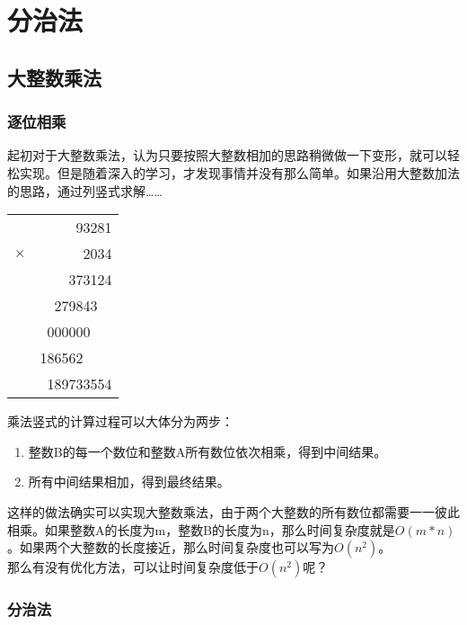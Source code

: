 \chapter{分治法}

\section{大整数乘法}

\subsection{逐位相乘}

起初对于大整数乘法，认为只要按照大整数相加的思路稍微做一下变形，就可以轻松实现。但是随着深入的学习，才发现事情并没有那么简单。如果沿用大整数加法的思路，通过列竖式求解……

\begin{table}[H]
	\centering
	\begin{tabular}{cD{.}{.}{3}}
		           & 93281         \\
		$ \times $ & 2034          \\
		\hline
		           & 373124        \\
		           & 279843\ \     \\
		           & 000000\ \ \   \\
		           & 186562\ \ \ \ \\
		\hline
		           & 189733554
	\end{tabular}
\end{table}

乘法竖式的计算过程可以大体分为两步：

\begin{enumerate}
	\item 整数B的每一个数位和整数A所有数位依次相乘，得到中间结果。
	\item 所有中间结果相加，得到最终结果。
\end{enumerate}

这样的做法确实可以实现大整数乘法，由于两个大整数的所有数位都需要一一彼此相乘。如果整数A的长度为m，整数B的长度为n，那么时间复杂度就是$ O(m * n) $。如果两个大整数的长度接近，那么时间复杂度也可以写为$ O(n^2) $。\\

那么有没有优化方法，可以让时间复杂度低于$ O(n^2) $呢？\\

\subsection{分治法}

